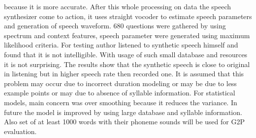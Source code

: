 because it is more accurate. After this whole processing on data the speech synthesizer come to action, it uses straight
vocoder to estimate speech parameters and generation of speech waveform. 680 questions were gathered by using spectrum
and context features, speech parameter were generated using maximum likelihood criteria. For testing author listened to
synthetic speech himself and found that it is not intelligible. With usage of such small database and resources it is not
surprising. The results show that the synthetic speech is close to original in listening but in higher speech rate then recorded
one. It is assumed that this problem may occur due to incorrect duration modeling or may be due to less example points or
may due to absence of syllable information. For statistical models, main concern was over smoothing because it reduces the
variance. In future the model is improved by using large database and syllable information. Also set of at least 1000 words
with their phoneme sounds will be used for G2P evaluation.

